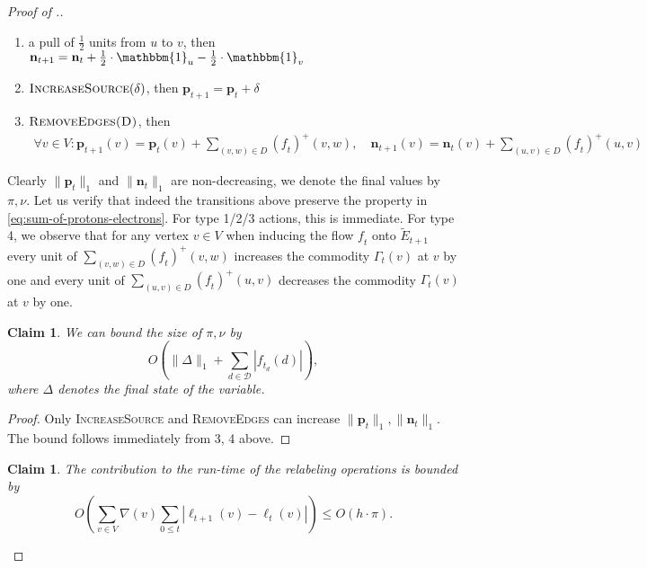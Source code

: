 \documentclass[11pt]{article}
\newtheorem{claim}[theorem]{Claim}
\newcommand\bell{\boldsymbol{\mathit{\ell}}}
\newcommand\ff{\boldsymbol{\mathit{f}}}
\begin{document}
\begin{proof}[Proof of .]
\begin{enumerate}
    \item a pull of $\frac{1}{2}$ units from $u$ to $v$, then $\textbf{n}_{t+1} = \textbf{n}_t + \frac{1}{2} \cdot \mathbbm{1}_u - \frac{1}{2} \cdot \mathbbm{1}_v$
    \item $\textsc{IncreaseSource}(\delta)$, then $\textbf{p}_{t+1} = \textbf{p}_t + \delta$
    \item $\textsc{RemoveEdges(D)}$, then 
    \begin{align*}
        \forall v \in V: \textbf{p}_{t+1}(v) = \textbf{p}_t(v) + \sum_{(v,w) \in D} \left(\ff_t\right)^+(v,w), \quad \textbf{n}_{t+1}(v) = \textbf{n}_t(v) + \sum_{(u,v) \in D} \left(\ff_{t}\right)^+(u,v)
    \end{align*}
\end{enumerate}
Clearly $\|\textbf{p}_t\|_1$ and $\|\textbf{n}_t\|_1$ are non-decreasing, we denote the final values by $\pi, \nu$. Let us verify that indeed the transitions above preserve the property in \eqref{eq:sum-of-protons-electrons}. For type 1/2/3 actions, this is immediate. For type 4, we observe that for any vertex $v \in V$ when inducing the flow $\ff_{t}$ onto $\tilde{E}_{t+1}$ every unit of $\sum_{(v,w) \in D} (\ff_t)^+(v,w)$ increases the commodity $\Gamma_t(v)$ at $v$ by one and every unit of $\sum_{(u,v) \in D} (\ff_t)^+(u,v)$ decreases the commodity $\Gamma_t(v)$ at $v$ by one.

\begin{claim}\label{proof:LmPushPullRelabel-cl1}
    We can bound the size of $\pi, \nu$ by
    \[O\left(\|\Delta\|_1 + \sum_{d \in \mathcal{D}} |\ff_{t_d}(d)| \right),\]
    where $\Delta$ denotes the final state of the variable.
\end{claim}

\begin{proof}
    Only \textsc{IncreaseSource} and \textsc{RemoveEdges} can increase $\|\textbf{p}_t\|_1, \|\textbf{n}_t\|_1$. The bound follows immediately from 3, 4 above.
\end{proof}

\begin{claim}\label{proof:LmPushPullRelabel-cl2} 
    The contribution to the run-time of the relabeling operations is bounded by 
\[O\left( \sum_{v \in V} \nabla(v) \sum_{0 \leq t} |\bell_{t+1}(v) - \bell_t(v)|\right) \leq O \left(h \cdot \pi \right).\]
\end{claim}


\end{proof}
\end{document}
